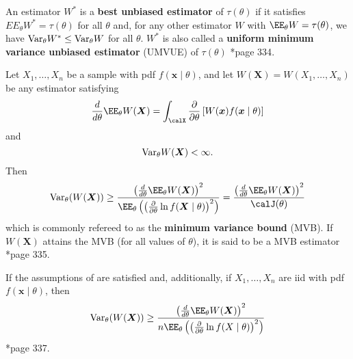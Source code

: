 \begin{defe} \label{defe: umvu}
    An estimator $W^{\ast}$ is a {\bf best unbiased estimator} of $\tau (\theta)$ if it satisfies $EE_{\theta} W^{\ast} = \tau (\theta)$ for all $\theta$ and, for any other estimator $W$ with $\EE_{\theta} W = \tau (\theta)$, we have ${\operatorname{Var}}_{\theta} W^{\ast} \leq {\operatorname{Var}}_{\theta} W$ for all $\theta$. $W^{\ast}$ is also called a {\bf uniform minimum variance unbiased estimator} (UMVUE) of $\tau (\theta)$ \cite{CasellaGeorge2001SI}*{page 334}.
\end{defe}

\begin{thm} \label{thm: cri_neq}
    Let $X_1 , \ldots , X_n$ be a sample with pdf $f(\bm{x} \mid \theta)$, and let $W(\bm{X}) = W(X_1 , \ldots , X_n)$ be any estimator satisfying
    \begin{equation*}
        \frac{d}{d \theta} \EE_{\theta} W(\bm{X}) = \int_{\calX} \frac{\partial}{\partial \theta} \left[ W(\bm{x}) f(\bm{x} \mid \theta) \right]
    \end{equation*}
    and
    \begin{equation*}
        {\operatorname{Var}}_{\theta} W(\bm{X}) < \infty.
    \end{equation*}
    Then
    \begin{equation*}
        \Var_{\theta} (W(\bm{X})) \geq \frac{\left( \frac{d}{d \theta} \EE_{\theta} W(\bm{X}) \right)^2}{\EE_{\theta} \left( \left( \frac{\partial}{\partial \theta} \ln f(\bm{X} \mid \theta)  \right)^2 \right)} = \frac{\left( \frac{d}{d \theta} \EE_{\theta} W(\bm{X}) \right)^2}{\calJ (\theta)}
    \end{equation*}
    which is commonly refereed to as the {\bf minimum variance bound} (MVB). If $W(\bm{X})$ attains the MVB (for all values of $\theta$), it is said to be a MVB estimator \cite{CasellaGeorge2001SI}*{page 335}.
\end{thm}

\begin{cor} \label{cor: cri_neq_iid}
    If the assumptions of  are satisfied and, additionally, if $X_1 , \ldots , X_n$ are iid with pdf $f(\bm{x} \mid \theta)$, then
    \begin{equation*}
        \Var_{\theta} (W(\bm{X})) \geq \frac{\left( \frac{d}{d \theta} \EE_{\theta} W(\bm{X}) \right)^2}{n \EE_{\theta} \left( \left( \frac{\partial}{\partial \theta} \ln f(X \mid \theta)  \right)^2 \right)}
    \end{equation*}
    \cite{CasellaGeorge2001SI}*{page 337}.
\end{cor}

